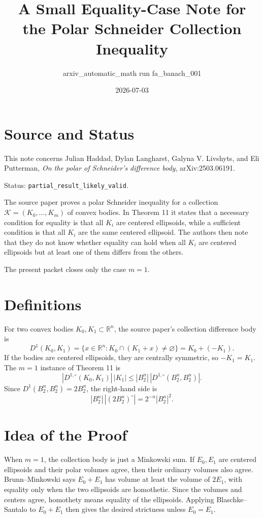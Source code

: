\documentclass[11pt]{amsart}
\title{A Small Equality-Case Note for the Polar Schneider Collection Inequality}
\author{arxiv\_automatic\_math run fa\_banach\_001}
\date{2026-07-03}
\newcommand{\R}{\mathbb R}
\newcommand{\B}{B_2^n}
\begin{document}
\maketitle

\section*{Source and Status}

This note concerns Julian Haddad, Dylan Langharst, Galyna V. Livshyts, and Eli
Putterman, \emph{On the polar of Schneider's difference body}, arXiv:2503.06191.

Status: \texttt{partial\_result\_likely\_valid}.

The source paper proves a polar Schneider inequality for a collection
\(\mathcal K=(K_0,\ldots,K_m)\) of convex bodies.  In Theorem 11 it states that
a necessary condition for equality is that all \(K_i\) are centered ellipsoids,
while a sufficient condition is that all \(K_i\) are the same centered
ellipsoid.  The authors then note that they do not know whether equality can
hold when all \(K_i\) are centered ellipsoids but at least one of them differs
from the others.

The present packet closes only the case \(m=1\).

\section*{Definitions}

For two convex bodies \(K_0,K_1\subset\R^n\), the source paper's collection
difference body is
\[
  D^1(K_0,K_1)=\{x\in\R^n:K_0\cap(K_1+x)\neq\varnothing\}
  =K_0+(-K_1).
\]
If the bodies are centered ellipsoids, they are centrally symmetric, so
\(-K_1=K_1\).  The \(m=1\) instance of Theorem 11 is
\[
  |D^{1,\circ}(K_0,K_1)|\,|K_1|
  \leq |\B|\,|D^{1,\circ}(\B,\B)|.
\]
Since \(D^1(\B,\B)=2\B\), the right-hand side is
\[
  |\B|\,|(2\B)^\circ|=2^{-n}|\B|^2.
\]

\section*{Idea of the Proof}

When \(m=1\), the collection body is just a Minkowski sum.  If \(E_0,E_1\) are
centered ellipsoids and their polar volumes agree, then their ordinary volumes
also agree.  Brunn--Minkowski says \(E_0+E_1\) has volume at least the volume of
\(2E_1\), with equality only when the two ellipsoids are homothetic.  Since the
volumes and centers agree, homothety means equality of the ellipsoids.  Applying
Blaschke--Santalo to \(E_0+E_1\) then gives the desired strictness unless
\(E_0=E_1\).
\end{document}
